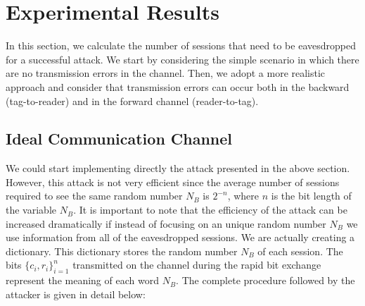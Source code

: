\documentclass{article}
\begin{document}
\section{Experimental Results}\label{sec::experiments}
In this section, we calculate the number of sessions that need to be eavesdropped for a successful attack.  We start by considering the simple scenario in which there are no transmission errors in the channel.  Then, we adopt a more realistic approach and consider that transmission errors can occur both in the backward (tag-to-reader) and in the forward channel (reader-to-tag).

\subsection{Ideal Communication Channel}\label{sec::idealcomm}

We could start implementing directly the attack presented in the above section. However, this attack is not very efficient since the average number of sessions required to see the same random number $N_B$ is $2^{-n}$, where $n$ is the bit length of the variable $N_B$. It is important to note that the efficiency of the attack can be increased dramatically if instead of focusing on an unique random number $N_B$ we use information from all of the eavesdropped sessions. We are actually creating a dictionary. This dictionary stores the random number $N_B$ of each session. The bits $\{c_i, r_i\}_{i=1}^n$ transmitted on the channel during the rapid bit exchange represent the meaning of each word $N_B$. The complete procedure followed by the attacker is given in detail below:
\end{document}
